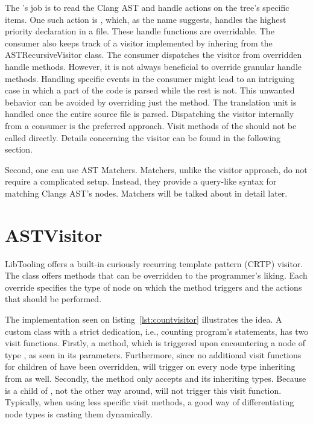 The 's job is to read the Clang AST and handle actions
on the tree's specific items. 
One such action is , which, as the name suggests,
handles the highest priority declaration in a file. 
These handle functions are overridable. 
The consumer also keeps track of a visitor implemented by inhering from 
the ASTRecursiveVisitor class. 
The consumer dispatches the visitor from overridden handle methods. 
However, it is not always beneficial to override granular handle methods. 
Handling specific events in the consumer might lead to an intriguing case 
in which a part of the code is parsed while the rest is not. 
This unwanted behavior can be avoided by overriding just 
the  method. 
The translation unit is handled once the entire source file is parsed. 
Dispatching the visitor internally from a consumer is the preferred 
approach. 
Visit methods of the  should not be called 
directly. 
Details concerning the visitor can be found in the following section.

Second, one can use AST Matchers. 
Matchers, unlike the visitor approach, do not require a complicated setup. 
Instead, they provide a query-like syntax for matching Clangs AST's nodes. 
Matchers will be talked about in detail later.

\section{ASTVisitor}

LibTooling offers a built-in curiously recurring template pattern 
(CRTP) visitor. 
The class  offers  methods that 
can be overridden to the programmer's liking. 
Each override specifies the type of node on which the method 
triggers and the actions that should be performed.

The implementation seen on listing~\ref{lst:countvisitor} illustrates
the idea. A custom class with a strict dedication, i.e., counting
program's statements, has two visit functions.
Firstly, a  method, which is triggered upon
encountering a node of type , as seen in its
parameters. 
Furthermore, since no additional visit functions for children 
of  have been overridden, 
will trigger on every node type inheriting from  as well.
Secondly, the method  only accepts 
and its inheriting types.
Because  is a child of , not the other way
around,  will not trigger this visit function.
Typically, when using less specific visit methods, a good 
way of differentiating node types is casting them dynamically.

